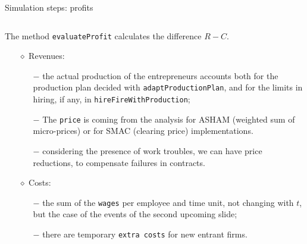 \documentclass[9pt]{beamer}
\begin{document}
\begin{frame}[fragile]{Simulation steps: profits}

\begin{columns}[T]
\begin{column}{.7\textwidth}
\begin{block}{}


The method \verb|evaluateProfit| calculates the difference $R - C$. 

\begin{itemize}
\item[$\diamond$] Revenues:

\begin{itemize}

\item[$-$] the actual production of the entrepreneurs accounts both for the production plan decided with \verb"adaptProductionPlan", and for the limits in hiring, if any, in \verb"hireFireWithProduction";

\item[$-$] The \verb"price" is coming from the analysis for ASHAM (weighted sum of micro-prices) or for SMAC (clearing price) implementations.

\item[$-$] considering the presence of work troubles, we can have price reductions, to compensate failures in contracts. 
 
\end{itemize}

\item[$\diamond$] Costs:

\begin{itemize}

\item[$-$ ]the sum of the \verb"wages" per employee and time unit, not changing with $t$, but the case of the events of the second upcoming slide;

\item[$-$] there are temporary \verb"extra costs" for new entrant firms.

\end{itemize}

\end{itemize}
     
\end{block}
\end{column}


\end{columns}
\end{frame}
\end{document}
